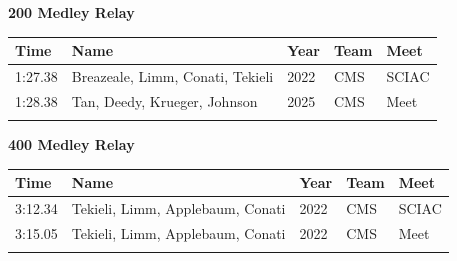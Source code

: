 \vspace{1.2em}
\noindent\begin{minipage}[t]{0.98\textwidth}
\centering
\textbf{\textcolor{teamprimary}{200 Medley Relay}}\par
\vspace{0.5em}
\centering
\small
\renewcommand{\arraystretch}{1.0}
\setlength{\tabcolsep}{4pt}
\begin{tabular}{@{}p{2.7cm}p{4.3cm}p{1.6cm}p{2.7cm}p{2.7cm}@{}}
\toprule
\textbf{Time} & \textbf{Name} & \textbf{Year} & \textbf{Team} & \textbf{Meet} \\
\midrule
1:27.38 & Breazeale, Limm, Conati, Tekieli & 2022 & CMS & SCIAC \\
1:28.38 & Tan, Deedy, Krueger, Johnson & 2025 & CMS & Meet \\
\bottomrule
\vspace{0.5em}
\end{tabular}
\end{minipage}
\vspace{1.2em}
\noindent\begin{minipage}[t]{0.98\textwidth}
\centering
\textbf{\textcolor{teamprimary}{400 Medley Relay}}\par
\vspace{0.5em}
\centering
\small
\renewcommand{\arraystretch}{1.0}
\setlength{\tabcolsep}{4pt}
\begin{tabular}{@{}p{2.7cm}p{4.3cm}p{1.6cm}p{2.7cm}p{2.7cm}@{}}
\toprule
\textbf{Time} & \textbf{Name} & \textbf{Year} & \textbf{Team} & \textbf{Meet} \\
\midrule
3:12.34 & Tekieli, Limm, Applebaum, Conati & 2022 & CMS & SCIAC \\
3:15.05 & Tekieli, Limm, Applebaum, Conati & 2022 & CMS & Meet \\
\bottomrule
\vspace{0.5em}
\end{tabular}
\end{minipage}